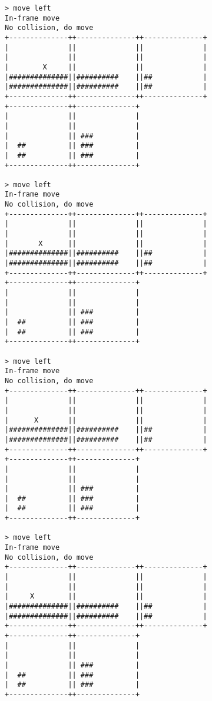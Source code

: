 \begin{verbatim}
> move left
In-frame move
No collision, do move
+--------------++--------------++--------------+
|              ||              ||              |
|              ||              ||              |
|        X     ||              ||              |
|##############||##########    ||##            |
|##############||##########    ||##            |
+--------------++--------------++--------------+
+--------------++--------------+                
|              ||              |                
|              ||              |                
|              || ###          |                
|  ##          || ###          |                
|  ##          || ###          |                
+--------------++--------------+                

> move left
In-frame move
No collision, do move
+--------------++--------------++--------------+
|              ||              ||              |
|              ||              ||              |
|       X      ||              ||              |
|##############||##########    ||##            |
|##############||##########    ||##            |
+--------------++--------------++--------------+
+--------------++--------------+                
|              ||              |                
|              ||              |                
|              || ###          |                
|  ##          || ###          |                
|  ##          || ###          |                
+--------------++--------------+                

> move left
In-frame move
No collision, do move
+--------------++--------------++--------------+
|              ||              ||              |
|              ||              ||              |
|      X       ||              ||              |
|##############||##########    ||##            |
|##############||##########    ||##            |
+--------------++--------------++--------------+
+--------------++--------------+                
|              ||              |                
|              ||              |                
|              || ###          |                
|  ##          || ###          |                
|  ##          || ###          |                
+--------------++--------------+                

> move left
In-frame move
No collision, do move
+--------------++--------------++--------------+
|              ||              ||              |
|              ||              ||              |
|     X        ||              ||              |
|##############||##########    ||##            |
|##############||##########    ||##            |
+--------------++--------------++--------------+
+--------------++--------------+                
|              ||              |                
|              ||              |                
|              || ###          |                
|  ##          || ###          |                
|  ##          || ###          |                
+--------------++--------------+                


\end{verbatim}
